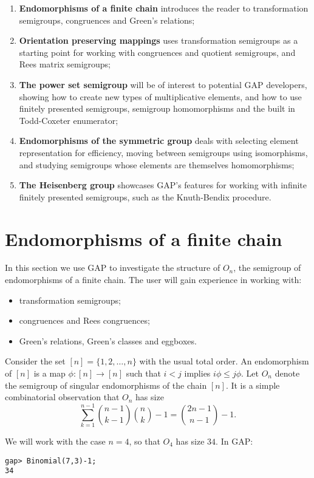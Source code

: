 \documentclass{ws-p8-50x6-00}
\theoremstyle{plain} \newtheorem{Thm}{Theorem}
\theoremstyle{plain} \newtheorem{Cor}{Corollary}
\theoremstyle{plain} \newtheorem{Lemma}{Lemma}
\theoremstyle{plain} \newtheorem{Prop}{Proposition}
\theoremstyle{plain} \newtheorem{Ex}{Exercise}
\def\gap{\sf GAP}
\begin{document}
\begin{enumerate}
\item {\bf Endomorphisms of a finite chain} introduces the reader to
transformation semigroups, congruences and Green's relations;
\item {\bf Orientation preserving mappings} uses transformation semigroups
as a starting point for working with congruences and quotient semigroups,
and Rees matrix semigroups;
\item {\bf The power set semigroup} will be of interest to potential 
{\gap} developers, showing how to create new types of multiplicative elements,
and how to use finitely presented semigroups, semigroup homomorphisms and
the built in Todd-Coxeter enumerator;
\item {\bf Endomorphisms of the symmetric group} deals with 
selecting element representation for efficiency,
moving between semigroups using isomorphisms, 
and studying semigroups whose elements are themselves homomorphisms;
\item {\bf The Heisenberg group} showcases {\gap}'s features for working
with infinite finitely presented semigroups, such as the Knuth-Bendix 
procedure.
\end{enumerate}

\section{Endomorphisms of a finite chain}
In this section we use {\gap} to investigate the structure of 
$O_n$, the semigroup of endomorphisms of a finite chain.  
The user will gain experience in working with:
\begin{itemize}
\item transformation semigroups;
\item congruences and Rees congruences;
\item Green's relations, Green's classes and eggboxes.
\end{itemize}


Consider the set $[n] = \{1, 2, \ldots, n\}$ with the usual total order. 
An endomorphism of $[n]$ is a map $\phi: [n] \rightarrow [n]$ 
such that  $i < j$ implies $i\phi \leq j\phi$. Let $O_n$ denote
the semigroup of singular endomorphisms of the chain $[n]$.
It is a simple combinatorial observation\cite{tgl94} that $O_n$ has size
$$\sum_{k=1}^{n-1} \binom{n-1}{k-1} \binom{n}{k} - 1 = \binom{2n-1}{n-1} -1.$$

We will work with the case $n=4$, so that $O_4$ has size $34$. 
In {\gap}:
\begin{verbatim}
gap> Binomial(7,3)-1;
34
\end{verbatim}
\end{document}
